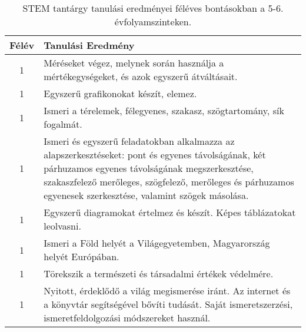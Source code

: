        
           \begin{longtable}{c | p{12cm} }
            \caption[STEM 5-6.]{STEM tantárgy tanulási eredményei féléves bontásokban a 5-6. évfolyamszinteken. }  \\

            \textbf{Félév} & \textbf{Tanulási Eredmény} \\
            \hline
            \endhead
                                
                                      
                                
                                          1 &  Méréseket végez, melynek során használja a mértékegységeket, és azok egyszerű átváltásait. \\ \hline
                                          1 &  Egyszerű grafikonokat készít, elemez. \\ \hline
                                          1 &  Ismeri a térelemek, félegyenes, szakasz, szögtartomány, sík fogalmát. \\ \hline
                                          1 &  Ismeri és egyszerű feladatokban alkalmazza az alapszerkesztéseket: pont és egyenes távolságának, két párhuzamos egyenes távolságának megszerkesztése, szakaszfelező merőleges, szögfelező, merőleges és párhuzamos egyenesek szerkesztése, valamint szögek másolása. \\ \hline
                                          1 &  Egyszerű diagramokat értelmez és  készít. Képes táblázatokat leolvasni.
 \\ \hline
                                          1 &  Ismeri a Föld helyét a Világegyetemben, Magyarország helyét Európában. \\ \hline
                                          1 &  Törekszik a természeti és társadalmi értékek védelmére. \\ \hline
                                          1 &  Nyitott, érdeklődő a világ megismerése iránt. Az internet és a könyvtár segítségével bővíti tudását. Saját ismeretszerzési, ismeretfeldolgozási módszereket használ. \\ \hline
                                      

\end{longtable}
